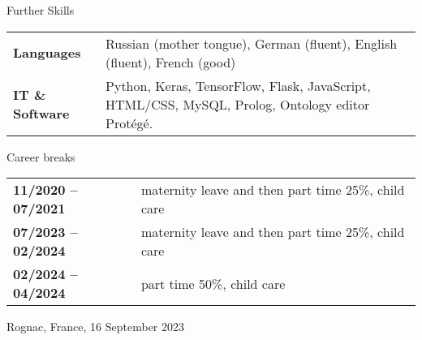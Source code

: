 \documentclass{resume} %
\begin{document}
\vspace{-10pt}

\begin{rSection}{Further Skills} 

\hspace{-20pt}
\begin{tabular}{p{3.8cm}p{13cm}}

{\bf Languages} &  Russian (mother tongue), German (fluent), English (fluent), French (good) \\[5pt]
{\bf IT \& Software} &  Python, Keras, TensorFlow, Flask, JavaScript, HTML/CSS, MySQL, Prolog, Ontology editor Prot\'eg\'e.

 
\end{tabular}

\end{rSection}

\vspace{-10pt}

\begin{rSection}{Career breaks}
	
	\hspace{-20pt}
	\begin{tabular}{p{3.8cm}p{13cm}}
		{\bf 11/2020 -- 07/2021 } & maternity leave and then part time 25\%, child care  \\[5pt]
		{\bf 07/2023 -- 02/2024 } & maternity leave and then part time 25\%, child care  \\[5pt]
		{\bf 02/2024 -- 04/2024 } & part time 50\%, child care  \\[5pt]
	\end{tabular}
\end{rSection}
\bigskip

\bigskip

Rognac, France, 16 September 2023
\end{document}
